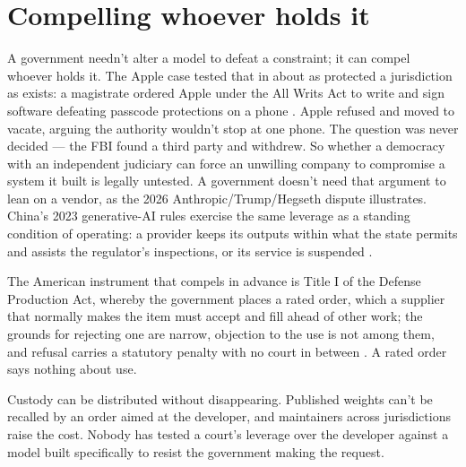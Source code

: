 \section{Compelling whoever holds it}
\label{sec:15.3}
A government needn't alter a model to defeat a constraint; it can compel whoever holds it. The Apple case tested that in about as protected a jurisdiction as exists: a magistrate ordered Apple under the All Writs Act to write and sign software defeating passcode protections on a phone \autocite{pym2016applefbi}. Apple refused and moved to vacate, arguing the authority wouldn't stop at one phone. The question was never decided — the FBI found a third party and withdrew. So whether a democracy with an independent judiciary can force an unwilling company to compromise a system it built is legally untested. A government doesn't need that argument to lean on a vendor, as the 2026 Anthropic/Trump/Hegseth dispute illustrates. China's 2023 generative-AI rules exercise the same leverage as a standing condition of operating: a provider keeps its outputs within what the state permits and assists the regulator's inspections, or its service is suspended \autocite[arts.~4, 14, 17, 19, 21]{cac2023genai}.

The American instrument that compels in advance is Title I of the Defense Production Act, whereby the government places a rated order, which a supplier that normally makes the item must accept and fill ahead of other work; the grounds for rejecting one are narrow, objection to the use is not among them, and refusal carries a statutory penalty with no court in between \autocite{dpa1950,dpas2026}. A rated order says nothing about use.

Custody can be distributed without disappearing. Published weights can't be recalled by an order aimed at the developer, and maintainers across jurisdictions raise the cost.
Nobody has tested a court's leverage over the developer against a model built specifically to resist the government making the request.
